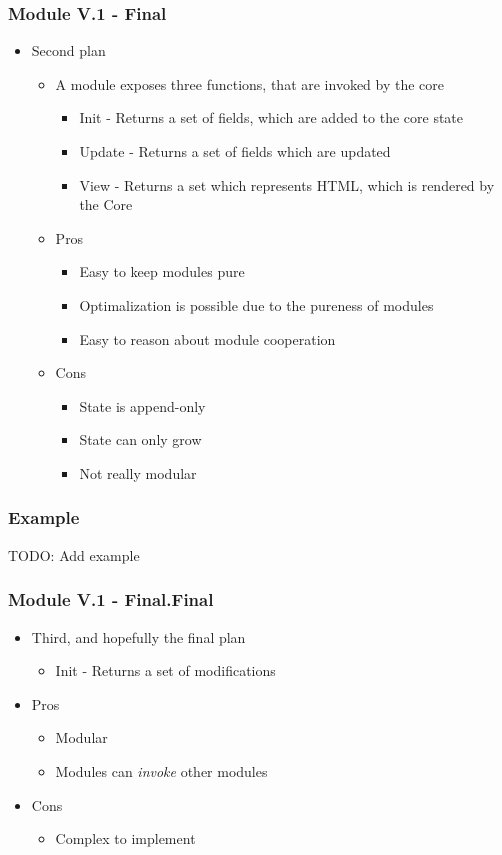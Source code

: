 \begin{frame}
  \frametitle{Module V.1 - Final}
  \begin{itemize}
    \item Second plan
    \begin{itemize}
      \item A module exposes three functions, that are invoked by the core
      \begin{itemize}
        \item Init - Returns a set of fields, which are added to the core state
        \item Update - Returns a set of fields which are updated
        \item View - Returns a set which represents HTML, which is rendered by
          the Core
      \end{itemize}
      \item Pros
      \begin{itemize}
        \item Easy to keep modules pure
        \item Optimalization is possible due to the pureness of modules
        \item Easy to reason about module cooperation
      \end{itemize}
      \item Cons
      \begin{itemize}
        \item State is append-only
        \item State can only grow
        \item Not really modular
      \end{itemize}
    \end{itemize}
  \end{itemize}
\end{frame}

\begin{frame}
  \frametitle{Example}
  TODO: Add example
\end{frame}

\begin{frame}
  \frametitle{Module V.1 - Final.Final}
  \begin{itemize}
    \item Third, and hopefully the final plan
      \begin{itemize}
        \item Init - Returns a set of modifications
      \end{itemize}
    \item Pros
    \begin{itemize}
      \item Modular
      \item Modules can \textit{invoke} other modules
    \end{itemize}
    \item Cons
    \begin{itemize}
      \item Complex to implement
    \end{itemize}
  \end{itemize}
\end{frame}

